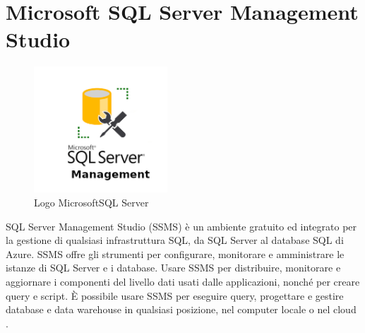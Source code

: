 \section{Microsoft SQL Server Management Studio}
\begin{figure}[ht!]
\begin{center}
  \includegraphics[width=5cm]{images/mssql.png}
  \caption{Logo MicrosoftSQL Server}
\end{center}
\end{figure}
SQL Server Management Studio (SSMS) è un ambiente gratuito ed integrato per la gestione di qualsiasi infrastruttura SQL, da SQL Server al database SQL di Azure. SSMS offre gli strumenti per configurare, monitorare e amministrare le istanze di SQL Server e i database. Usare SSMS per distribuire, monitorare e aggiornare i componenti del livello dati usati dalle applicazioni, nonché per creare query e script.
È possibile usare SSMS per eseguire query, progettare e gestire database e data warehouse in qualsiasi posizione, nel computer locale o nel cloud \cite{MSSQL}.

\pagebreak
